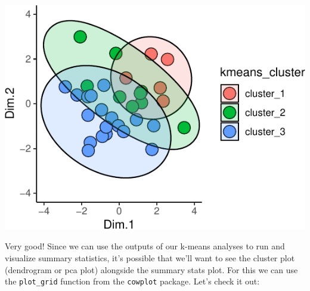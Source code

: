 \documentclass[
]{krantz}
\begin{document}
\begin{center}\includegraphics{index_files/figure-latex/unnamed-chunk-108-1} \end{center}

Very good! Since we can use the outputs of our k-means analyses to run and visualize summary statistics, it's possible that we'll want to see the cluster plot (dendrogram or pca plot) alongside the summary stats plot. For this we can use the \texttt{plot\_grid} function from the \texttt{cowplot} package. Let's check it out:
\end{document}
